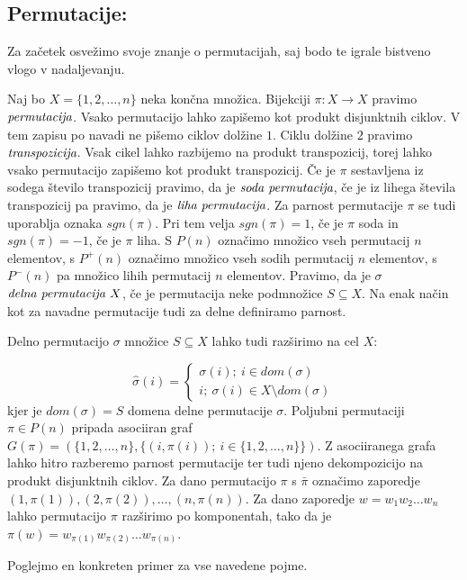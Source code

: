 \documentclass[mat1]{fmfdelo}
\newcommand{\pojem}[1]{\ensuremath{\emph{#1}}}
\newcommand{\map}[3]{\ensuremath{{#1}:{#2}\rightarrow{#3}}}
\begin{document}
\subsection{Permutacije:}\label{subsect:perm}
Za začetek osvežimo svoje znanje o permutacijah, saj bodo te igrale bistveno vlogo v nadaljevanju.
\begin{definicija}
	Naj bo $X=\{1, 2, \ldots, n\}$ neka končna množica. Bijekciji $\map{\pi}{X}{X}$ pravimo \pojem{permutacija}. Vsako permutacijo lahko zapišemo kot produkt disjunktnih ciklov. V tem zapisu po navadi ne pišemo ciklov dolžine $1$. Ciklu dolžine $2$ pravimo \pojem{transpozicija}. Vsak cikel lahko razbijemo na produkt transpozicij, torej lahko vsako permutacijo zapišemo kot produkt transpozicij. Če je $\pi$ sestavljena iz sodega število transpozicij pravimo, da je \pojem{soda permutacija}, če je iz lihega števila transpozicij pa pravimo, da je \pojem{liha permutacija}. Za parnost permutacije $\pi$ se tudi uporablja oznaka $sgn(\pi)$. Pri tem velja $sgn(\pi)=1$, če je $\pi$ soda in $sgn(\pi) = -1$, če je $\pi$ liha. S $P(n)$ označimo množico vseh permutacij $n$ elementov, s $P^{+}(n)$ označimo množico vseh sodih permutacij $n$ elementov, s $P^{-}(n)$ pa množico lihih permutacij $n$ elementov. 
	Pravimo, da je $\sigma$ \pojem{delna permutacija $X$}, če je permutacija neke podmnožice $S\subseteq X$. Na enak način kot za navadne permutacije tudi za delne definiramo parnost.
	
	Delno permutacijo $\sigma$ množice $S\subseteq X$ lahko tudi razširimo na cel $X$:
	
	$$
	\hat{\sigma}(i) = \begin{cases*}
		\sigma(i);~i\in dom(\sigma) \\
		i;~\sigma(i) \in X\setminus dom(\sigma)
	\end{cases*}
	$$
	kjer je $dom(\sigma) = S$ domena delne permutacije $\sigma$.
	Poljubni permutaciji $\pi\in P(n)$ pripada asociiran graf $G(\pi) = (\{1, 2, \ldots, n\}, \{(i, \pi(i));~i\in \{1, 2, \ldots, n\}\})$. Z asociiranega grafa lahko hitro razberemo parnost permutacije ter tudi njeno dekompozicijo na produkt disjunktnih ciklov.
	Za dano permutacijo $\pi$ s $\bar{\pi}$ označimo zaporedje $(1, \pi(1)), (2, \pi(2)), \ldots, (n, \pi(n))$. Za dano zaporedje $w = w_1w_2\ldots w_n$ lahko permutacijo $\pi$ razširimo po komponentah, tako da je $\pi(w) = w_{\pi(1)}w_{\pi(2)}\ldots w_{\pi(n)}$.
\end{definicija}
Poglejmo en konkreten primer za vse navedene pojme.
\end{document}
